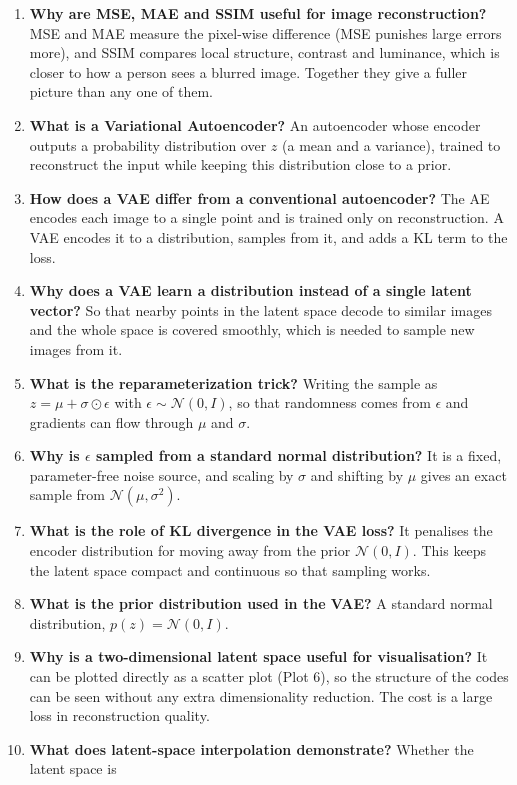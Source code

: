 \documentclass[10pt]{article}
\begin{document}
\begin{enumerate}
\item \textbf{Why are MSE, MAE and SSIM useful for image reconstruction?} MSE and MAE
measure the pixel-wise difference (MSE punishes large errors more), and SSIM compares
local structure, contrast and luminance, which is closer to how a person sees a blurred
image. Together they give a fuller picture than any one of them.
\item \textbf{What is a Variational Autoencoder?} An autoencoder whose encoder outputs a
probability distribution over $z$ (a mean and a variance), trained to reconstruct the input
while keeping this distribution close to a prior.
\item \textbf{How does a VAE differ from a conventional autoencoder?} The AE encodes each
image to a single point and is trained only on reconstruction. A VAE encodes it to a distribution,
samples from it, and adds a KL term to the loss.
\item \textbf{Why does a VAE learn a distribution instead of a single latent vector?} So
that nearby points in the latent space decode to similar images and the whole space is
covered smoothly, which is needed to sample new images from it.
\item \textbf{What is the reparameterization trick?} Writing the sample as
$z=\mu+\sigma\odot\epsilon$ with $\epsilon\sim\mathcal{N}(0,I)$, so that randomness comes from
$\epsilon$ and gradients can flow through $\mu$ and $\sigma$.
\item \textbf{Why is $\epsilon$ sampled from a standard normal distribution?} It is a fixed, parameter-free noise source, and scaling by $\sigma$ and shifting by $\mu$ gives an exact sample from $\mathcal{N}(\mu,\sigma^2)$.
\item \textbf{What is the role of KL divergence in the VAE loss?} It penalises the
encoder distribution for moving away from the prior $\mathcal{N}(0,I)$. This keeps
the latent space compact and continuous so that sampling works.
\item \textbf{What is the prior distribution used in the VAE?} A standard normal distribution,
$p(z)=\mathcal{N}(0,I)$.
\item \textbf{Why is a two-dimensional latent space useful for visualisation?} It can be
plotted directly as a scatter plot (Plot 6), so the structure of the codes can be seen without
any extra dimensionality reduction. The cost is a large loss in reconstruction quality.
\item \textbf{What does latent-space interpolation demonstrate?} Whether the latent space is

\end{enumerate}
\end{document}
